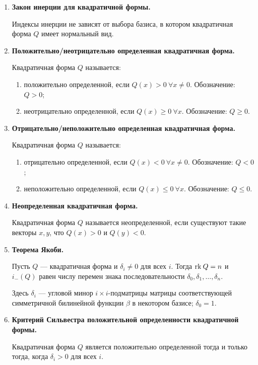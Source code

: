 \begin{enumerate}
\item \textbf{Закон инерции для квадратичной формы.}

Индексы инерции не зависят от выбора базиса, в котором квадратичная форма $Q$ имеет нормальный вид.

\item \textbf{Положительно/неотрицательно определенная квадратичная форма.}

Квадратичная форма $Q$ называется:
\begin{enumerate}
\item положительно определенной, если $Q(x) > 0\ \forall x \neq 0$. Обозначение: $Q > 0$;
\item неотрицательно определенной, если $Q(x) \geqslant 0\ \forall x$. Обозначение: $Q \geqslant 0$.
\end{enumerate}

\item \textbf{Отрицательно/неположительно определенная квадратичная форма.}

Квадратичная форма $Q$ называется:
\begin{enumerate}
\item отрицательно определенной, если $Q(x) < 0\  \forall x \neq 0$. Обозначение: $Q < 0$;
\item неположительно определенной, если $Q(x) \leqslant 0\ \forall x$. Обозначение: $Q \leqslant 0$.
\end{enumerate}

\item \textbf{Неопределенная квадратичная форма.}

Квадратичная форма $Q$ называется неопределенной, если существуют такие векторы $x, y$, что $Q(x) > 0$ и $Q(y) < 0$.

\item \textbf{Теорема Якоби.}

Пусть $Q$ --- квадратичная форма и $\delta_i \neq 0$ для всех $i$. Тогда $\mathrm{rk}\: Q = n$ и $i_{-}(Q)$ равен числу перемен знака последовательности $\delta_0, \delta_1, \ldots, \delta_n$.

Здесь $\delta_i$ --- угловой минор $i\times i$-подматрицы матрицы соответствующей симметричной билинейной функции $\beta$ в некотором базисе; $\delta_0 = 1$.

\item \textbf{Критерий Сильвестра положительной определенности квадратичной формы.}

Квадратичная форма $Q$ является положительно определенной тогда и только тогда, когда $\delta_i > 0$  для всех $i$.


\end{enumerate}
